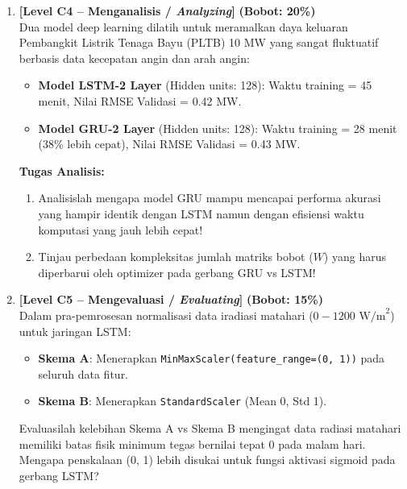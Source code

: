 \documentclass[11pt,a4paper]{article}
\begin{document}
\begin{enumerate}[leftmargin=1.5em, label=\textbf{Soal \arabic*.}]
    \newpage

    \item \textbf{[Level C4 -- Menganalisis / \textit{Analyzing}]} \hfill \textbf{(Bobot: 20\%)} \\
    Dua model deep learning dilatih untuk meramalkan daya keluaran Pembangkit Listrik Tenaga Bayu (PLTB) 10 MW yang sangat fluktuatif berbasis data kecepatan angin dan arah angin:
    \begin{itemize}
        \item \textbf{Model LSTM-2 Layer} (Hidden units: 128): Waktu training = 45 menit, Nilai RMSE Validasi = 0.42 MW.
        \item \textbf{Model GRU-2 Layer} (Hidden units: 128): Waktu training = 28 menit (38\% lebih cepat), Nilai RMSE Validasi = 0.43 MW.
    \end{itemize}
    \textbf{Tugas Analisis:}
    \begin{enumerate}[label=\alph*.]
        \item Analisislah mengapa model GRU mampu mencapai performa akurasi yang hampir identik dengan LSTM namun dengan efisiensi waktu komputasi yang jauh lebih cepat!
        \item Tinjau perbedaan kompleksitas jumlah matriks bobot ($W$) yang harus diperbarui oleh optimizer pada gerbang GRU vs LSTM!
    \end{enumerate}

    \vspace{0.4cm}

    \item \textbf{[Level C5 -- Mengevaluasi / \textit{Evaluating}]} \hfill \textbf{(Bobot: 15\%)} \\
    Dalam pra-pemrosesan normalisasi data iradiasi matahari ($0 - 1200 \text{ W/m}^2$) untuk jaringan LSTM:
    \begin{itemize}
        \item \textbf{Skema A}: Menerapkan \texttt{MinMaxScaler(feature\_range=(0, 1))} pada seluruh data fitur.
        \item \textbf{Skema B}: Menerapkan \texttt{StandardScaler} (Mean 0, Std 1).
    \end{itemize}
    Evaluasilah kelebihan Skema A vs Skema B mengingat data radiasi matahari memiliki batas fisik minimum tegas bernilai tepat 0 pada malam hari. Mengapa penskalaan (0, 1) lebih disukai untuk fungsi aktivasi sigmoid pada gerbang LSTM?

    \vspace{0.4cm}


\end{enumerate}
\end{document}
